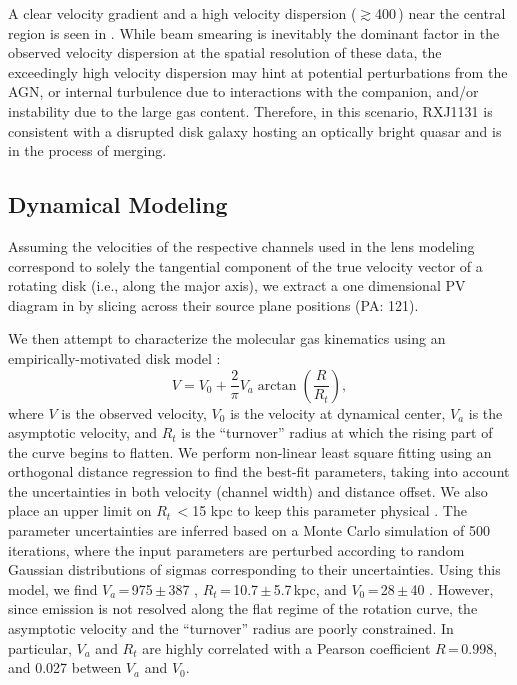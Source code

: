 \documentclass[]{emulateapj}
\begin{document}
A clear velocity gradient and a high
velocity dispersion ($\gtrsim$400\,\kms) near the central region
is seen in . While beam smearing is inevitably the
dominant factor in the observed velocity dispersion
at the spatial resolution of these data, the exceedingly
high velocity dispersion may hint
at potential perturbations from the AGN, or internal turbulence due to
interactions with the companion, and/or instability due to the large gas
content.
Therefore, in this scenario, RXJ1131 is
consistent with a disrupted disk galaxy hosting an optically
bright quasar and is in the process of merging.

\subsection{\bco Dynamical Modeling} \label{sec:dynamics} 
Assuming the velocities of the respective channels used in the
lens modeling correspond to solely the tangential component of the
true velocity vector of a rotating disk (i.e., along the major axis),
we extract a one dimensional PV diagram in 
by slicing across their source plane positions (PA: 121\degr).

We then attempt to characterize the molecular gas kinematics using an
empirically-motivated disk model \citep[\eg][]{Courteau97a,Puech08a,Miller11a}:
\begin{equation}
V = V_0 + \frac{2}{\pi} V_{a} \arctan(\frac{R}{R_{t}}),
\end{equation}
where $V$ is the observed velocity, $V_0$ is the velocity at dynamical center,
$V_{a}$ is the asymptotic velocity, and $R_{t}$ is the ``turnover''
radius at which the rising part of the curve begins to flatten.
We perform non-linear least square fitting using an orthogonal distance
regression to find the best-fit parameters,
taking into account the uncertainties in both velocity (channel width) and
distance offset. We also place an upper limit on $R_{t}$\,$<$15 kpc
to keep this parameter physical \citep[\eg][]{Puech08a,Miller11a}.
The parameter uncertainties are inferred based on a Monte Carlo simulation
of 500 iterations, where the input parameters are perturbed
according to random Gaussian distributions of sigmas
corresponding to their uncertainties.
Using this model, we find $V_{a}$\,=\,975\,$\pm$\,387 \kms,
$R_{t}$\,=\,10.7\,$\pm$\,5.7\,kpc, and $V_0$\,=\,28\,$\pm$\,40 \kms.
However, since emission is not resolved along the flat regime
of the rotation curve, the asymptotic velocity
and the ``turnover'' radius are poorly constrained.
In particular, $V_{a}$ and $R_{t}$ are highly correlated with a
Pearson coefficient $R$\,=\,0.998, and 0.027 between $V_{a}$ and $V_0$.
\end{document}
